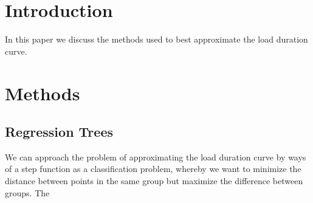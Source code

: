 \documentclass[10pt]{amsart}
\begin{document}
\section{Introduction}
In this paper we discuss the methods used to best approximate the load duration curve.
\section{Methods}
\subsection{Regression Trees}
We can approach the problem of approximating the load duration curve by ways of a step function as a classification problem, whereby we want to minimize the distance between points in the same group but maximize the difference between groups. 
The 

 
\end{document}
